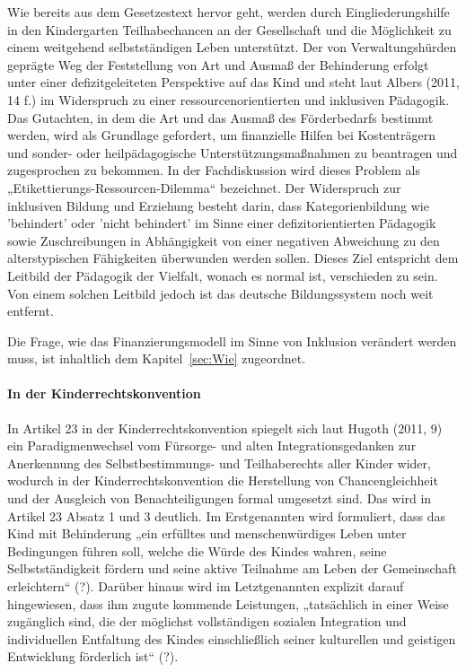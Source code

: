 Wie bereits aus dem Gesetzestext hervor geht, werden durch Eingliederungshilfe in den Kindergarten Teilhabechancen an der Gesellschaft und die Möglichkeit zu einem weitgehend selbstständigen Leben unterstützt. Der von Verwaltungshürden geprägte Weg der Feststellung von Art und Ausmaß der Behinderung erfolgt unter einer defizitgeleiteten Perspektive auf das Kind und steht laut Albers (2011, 14 f.) im Widerspruch zu einer ressourcenorientierten und inklusiven Pädagogik. Das Gutachten, in dem die Art und das Ausmaß des Förderbedarfs bestimmt werden, wird als Grundlage gefordert, um finanzielle Hilfen bei Kostenträgern und sonder- oder heilpädagogische Unterstützungsmaßnahmen zu beantragen und zugesprochen zu bekommen. In der Fachdiskussion wird dieses Problem als „Etikettierungs-Ressourcen-Dilemma“ bezeichnet. 
Der Widerspruch zur inklusiven Bildung und Erziehung besteht darin, dass Kategorienbildung wie 'behindert' oder 'nicht behindert' im Sinne einer defizitorientierten Pädagogik sowie Zuschreibungen in Abhängigkeit von einer negativen Abweichung zu den alterstypischen Fähigkeiten überwunden werden sollen. Dieses Ziel entspricht dem Leitbild der Pädagogik der Vielfalt, wonach es normal ist, verschieden zu sein. Von einem solchen Leitbild jedoch ist das deutsche Bildungssystem noch weit entfernt. 

Die Frage, wie das Finanzierungsmodell im Sinne von Inklusion verändert werden muss, ist inhaltlich dem Kapitel~\ref{sec:Wie} zugeordnet. 
 
\paragraph{In der Kinderrechtskonvention}
In Artikel 23 in der Kinderrechtskonvention spiegelt sich laut Hugoth (2011, 9) ein Paradigmenwechsel vom Fürsorge- und alten Integrationsgedanken zur Anerkennung des Selbstbestimmungs- und Teilhaberechts aller Kinder wider, wodurch in der Kinderrechtskonvention die Herstellung von Chancengleichheit und der Ausgleich von Benachteiligungen formal umgesetzt sind. Das wird in Artikel 23 Absatz 1 und 3 deutlich. Im Erstgenannten wird formuliert, dass das Kind mit Behinderung „ein erfülltes und menschenwürdiges Leben unter Bedingungen führen soll, welche die Würde des Kindes wahren, seine Selbstständigkeit fördern und seine aktive Teilnahme am Leben der Gemeinschaft erleichtern“ (?). Darüber hinaus wird im Letztgenannten explizit darauf hingewiesen, dass ihm zugute kommende Leistungen, „tatsächlich in einer Weise zugänglich sind, die der möglichst vollständigen sozialen Integration und individuellen Entfaltung des Kindes einschließlich seiner kulturellen und geistigen Entwicklung förderlich ist“ (?). 

